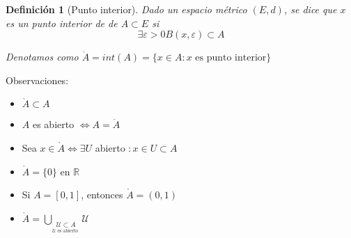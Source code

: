 \documentclass[10pt,a4paper,openright]{book}
\theoremstyle{break}
\newtheorem*{defi}{Definición}
\begin{document}
\begin{defi}[Punto interior]
Dado un espacio métrico $(E,d)$, se dice que $x$ es un punto interior de de $A \subset E$ si $$\exists \varepsilon > 0 B(x, \varepsilon) \subset A$$

Denotamos como $\mathring{A} = int(A) = \{x \in A : x \mbox{ es punto interior}\}$
\end{defi}
Observaciones:
\begin{itemize}
\item $\mathring{A} \subset A$

\item $A$ es abierto $\Leftrightarrow A = \mathring{A}$

\item Sea $x \in \mathring{A} \Leftrightarrow \exists U$ abierto $: x \in U \subset A$

\item $\mathring{A} = \{0\}$ en $\mathbb{R}$

\item Si $A = [0,1]$, entonces $\mathring{A} = (0,1)$

\item $\displaystyle \mathring{A} = \bigcup_{\underset{\mathcal{U} \mbox{ es abierto }}{\mathcal{U} \subset A}} \mathcal{U}$
\end{itemize}
\end{document}
